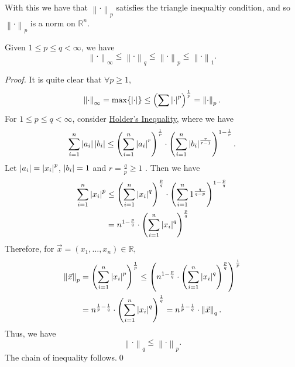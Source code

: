 \documentclass[notoc,notitlepage]{tufte-book}
\newcommand{\norm}[1]{\left\| #1 \right\|}
\begin{document}
\begin{note}
  With this we have that $\norm\cdot_p$ satisfies the triangle inequaltiy condition, and so $\norm\cdot_p$ is a norm on $\mathbb{R}^n$.
\end{note}

\begin{note}
  Given $1 \leq p \leq q < \infty$, we have
  \begin{equation*}
    \norm\cdot_\infty \leq \norm\cdot_q \leq \norm\cdot_p \leq \norm\cdot_1.
  \end{equation*}

  \begin{proof}
    It is quite clear that $\forall p \geq 1$,
    \begin{equation*}
      \norm\cdot_\infty = \max \{ \abs{\cdot} \} \leq \left( \sum \abs{\cdot}^p \right)^{\frac{1}{p}} =\norm\cdot_p.
    \end{equation*}
    For $1 \leq p \leq q < \infty$, consider \hyperref[thm:holder_s_inequality]{Holder's Inequality}, where we have
    \begin{equation*}
      \sum_{i=1}^{n} \left|a_i\right| \left|b_i\right| \leq \left( \sum_{i=1}^{n} \left|a_i\right|^r \right)^{\frac{1}{r}} \cdot \left( \sum_{i=1}^{n} \left|b_i\right|^{\frac{r}{r - 1}} \right)^{1 - \frac{1}{r}}.
    \end{equation*}
    Let $\left|a_i\right| = \left|x_i\right|^p$, $\left|b_i\right| = 1$ and $r = \frac{q}{p} \geq 1$ . Then we have
    \begin{align*}
      \sum_{i=1}^{n} \left|x_i\right|^p &\leq \left( \sum_{i=1}^{n} \left|x_i\right|^q \right)^{\frac{p}{q}} \cdot \left( \sum_{i=1}^{n} 1^{\frac{q}{q - p}} \right)^{1 - \frac{p}{q}} \\
                                 &= n^{1 - \frac{p}{q}} \cdot \left( \sum_{i=1}^{n} \left|x_i\right|^q \right)^\frac{p}{q}
    \end{align*}
    Therefore, for $\vec{x} = (x_1, \ldots, x_n) \in \mathbb{R}$,
    \begin{align*}
      \norm{\vec{x}}_p &= \left( \sum_{i=1}^{n} \abs{x_i}^p \right)^{\frac{1}{p}} \leq \left( n^{1 - \frac{p}{q}} \cdot \left( \sum_{i=1}^{n} \abs{x_i}^q \right)^\frac{p}{q} \right)^{\frac{1}{p}} \\
                       &= n^{\frac{1}{p} - \frac{1}{q}} \cdot \left( \sum_{i=1}^{n} \abs{x_i}^q \right)^{\frac{1}{q}} = n^{\frac{1}{p} - \frac{1}{q}} \cdot \norm{\vec{x}}_q.
    \end{align*}
    Thus, we have
    \begin{equation*}
      \norm\cdot_q \leq \norm\cdot_p.
    \end{equation*}
    The chain of inequality follows.\qed
  \end{proof}
\end{note}
\end{document}
